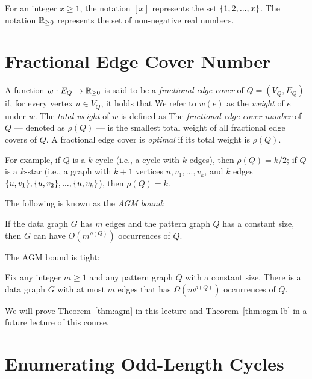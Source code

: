  For an integer $x \ge 1$, the notation $[x]$ represents the set $\{1, 2, ..., x\}$. The notation $\mathbb{R}_{\ge 0}$ represents the set of non-negative real numbers.

\section{Fractional Edge Cover Number} \label{sec:frac-edge-cover-num}

A function $w: E_Q \rightarrow \mathbb{R}_{\ge 0}$ is said to be a {\em fractional edge cover} of $Q = (V_Q, E_Q)$ if, for every vertex $u \in V_Q$, it holds that
We refer to $w(e)$ as the {\em weight} of $e$ under $w$.
The {\em total weight} of $w$ is defined as
The {\em fractional edge cover number} of $Q$ --- denoted as $\rho(Q)$ --- is the smallest total weight of all fractional edge covers of $Q$. A fractional edge cover is {\em optimal} if its total weight is $\rho(Q)$.

\vgap

For example, if $Q$ is a $k$-cycle (i.e., a cycle with $k$ edges), then $\rho(Q) = k/2$; if $Q$ is a $k$-star (i.e., a graph with $k + 1$ vertices $u, v_1, ..., v_k$, and $k$ edges $\{u, v_1\}, \{u, v_2\}, ..., \{u, v_k\}$), then $\rho(Q) = k$.

\vgap

The following is known as the {\em AGM bound}:

\begin{theorem} \label{thm:agm}
    If the data graph $G$ has $m$ edges and the pattern graph $Q$ has a constant size, then $G$ can have $O(m^{\rho(Q)})$ occurrences of $Q$.
\end{theorem}

The AGM bound is tight:

\begin{theorem} \label{thm:agm-lb}
    Fix any integer $m \ge 1$ and any pattern graph $Q$ with a constant size. There is a data graph $G$ with at most $m$ edges that has $\Omega(m^{\rho(Q)})$ occurrences of $Q$.
\end{theorem}

We will prove Theorem~\ref{thm:agm} in this lecture and Theorem~\ref{thm:agm-lb} in a future lecture of this course.

\section{Enumerating Odd-Length Cycles} \label{sec:cycle}

